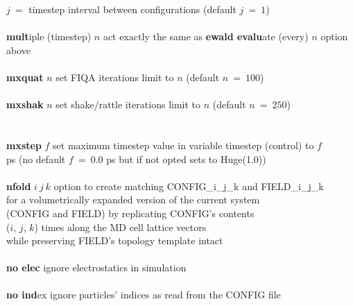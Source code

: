 \begin{tabbing}
\>                                              \> $j~=$ timestep interval between configurations (default $j~=~1$) \\
\>                                              \> \\
\> {\bf mult}iple (timestep) $n$                \> act exactly the same as {\bf ewald evalu}ate (every) $n$ option above \\
\>                                              \> \\
\> {\bf mxquat} $n$                             \> set FIQA iterations limit to $n$ (default $n~=~100$) \\
\>                                              \> \\
\> {\bf mxshak} $n$                             \> set shake/rattle iterations limit to $n$ (default $n~=~250$) \\
\>                                              \> \\
\>                                              \> \\
\> {\bf mxstep} $f$                             \> set maximum timestep value in variable timestep (control) to $f$ \\
\>                                              \> ps (no default $f~=~0.0$ ps but if not opted sets to Huge(1.0)) \\
\>                                              \> \\
\> {\bf nfold} $i~j~k$                          \> option to create matching CONFIG\_i\_j\_k and FIELD\_i\_j\_k \\
\>                                              \> for a volumetrically expanded version of the current system \\
\>                                              \> (CONFIG and FIELD) by replicating CONFIG's contents \\
\>                                              \> ($i$, $j$, $k$) times along the MD cell lattice vectors \\
\>                                              \> while preserving FIELD's topology template intact \\
\>                                              \> \\
\> {\bf no elec}                                \> ignore electrostatics in simulation \\
\>                                              \> \\
\> {\bf no ind}ex                               \> ignore particles' indices as read from the CONFIG file \\

\end{tabbing}
